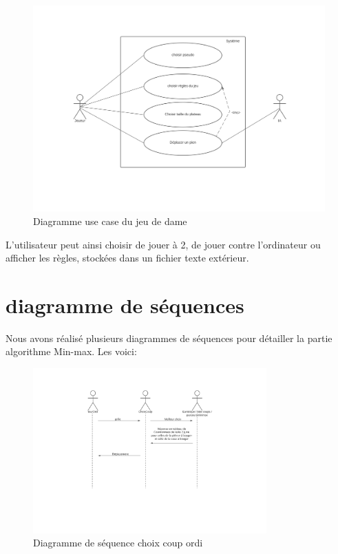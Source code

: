 \documentclass[12,french]{report}
\begin{document}
\begin{figure}[H]
	\center
	\includegraphics[width=1\textwidth]{./Images/Diagramme_use_case}
	\caption{Diagramme use case du jeu de dame}
\end{figure}\vspace{0.2cm}

L'utilisateur peut ainsi choisir de jouer à 2, de jouer contre l'ordinateur
ou afficher les règles, stockées dans un fichier texte extérieur.

\section{diagramme de séquences}

Nous avons réalisé plusieurs diagrammes de séquences pour détailler
la partie algorithme Min-max. Les voici:

\begin{figure}[H]
	\center
	\includegraphics[width=0.8\textwidth]{./Images/Diagramme_de_sequence1}
	\caption{Diagramme de séquence choix coup ordi}
\end{figure}\vspace{0.2cm}
\end{document}
